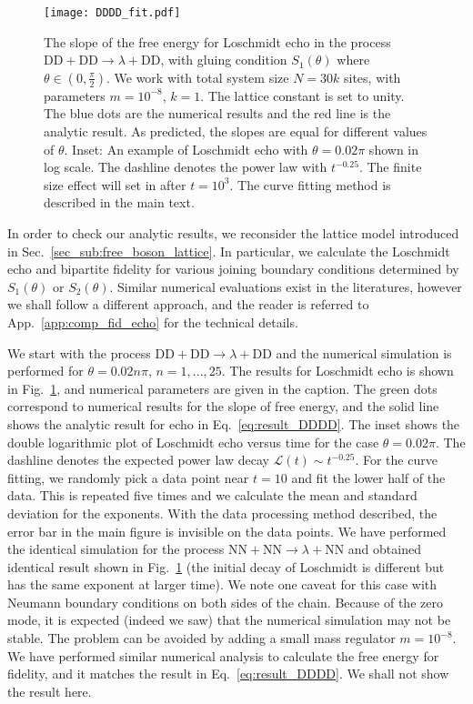 \begin{figure}[h]
\texttt{[image: DDDD\_fit.pdf]}
\caption{The slope of the free energy for Loschmidt echo in the process $\text{DD}+\text{DD}\rightarrow\lambda+\text{DD}$, with gluing condition $S_1(\theta)$ where $\theta\in(0,\frac{\pi}{2})$. We work with total system size $N=30k$ sites, with parameters $m=10^{-8}$, $k=1$. The lattice constant is set to unity. The blue dots are the numerical results and the red line is the analytic result. As predicted, the slopes are equal for different values of $\theta$. Inset: An example of Loschmidt echo with $\theta=0.02\pi$ shown in log scale. The dashline denotes the power law with $t^{-0.25}$. The finite size effect will set in after $t=10^{3}$. The curve fitting method is described in the main text.}
\label{fig:DDDD}
\end{figure}

In order to check our analytic results, we reconsider the lattice model introduced in Sec.~\ref{sec_sub:free_boson_lattice}. In particular, we calculate the Loschmidt echo and bipartite fidelity for various joining boundary conditions determined by $S_1(\theta)$ or $S_2(\theta)$. Similar numerical evaluations exist in the literatures\cite{vasseur_universal_2014,stephan_local_2011},  however we shall follow a different approach, and the reader is referred to App.~\ref{app:comp_fid_echo} for the technical details. 

We start with the process $\text{DD}+\text{DD}\rightarrow\lambda+\text{DD}$ and the numerical simulation is performed for $\theta=0.02n\pi$, $n=1,...,25$. The results for Loschmidt echo is shown in Fig.~\ref{fig:DDDD}, and numerical parameters are given in the caption. The green dots correspond to numerical results for the slope of free energy, and the solid line shows the analytic result for echo in Eq.~\eqref{eq:result_DDDD}. The inset shows the double logarithmic plot of Loschmidt echo versus time for the case $\theta=0.02\pi$. The dashline denotes the expected power law decay $\mathcal{L}(t)\sim t^{-0.25}$. For the curve fitting, we randomly pick a data point near $t=10$ and fit the lower half of the data. This is repeated five times and we calculate the mean and standard deviation for the exponents. With the data processing method described, the error bar in the main figure is invisible on the data points. We have performed the identical simulation for the process $\text{NN}+\text{NN}\rightarrow\lambda+\text{NN}$ and obtained identical result shown in Fig.~\ref{fig:DDDD} (the initial decay of Loschmidt is different but has the same exponent at larger time). We note one caveat for this case with Neumann boundary conditions on both sides of the chain. Because of the zero mode, it is expected (indeed we saw) that the numerical simulation may not be stable. The problem can be avoided by adding a small mass regulator $m=10^{-8}$. We have performed similar numerical analysis to calculate the free energy for fidelity, and it matches the result in Eq.~\eqref{eq:result_DDDD}. We shall not show the result here. 

